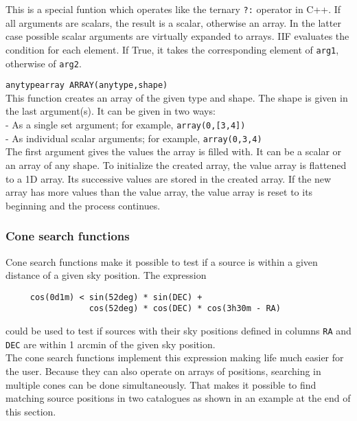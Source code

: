 \begin{description}
    This is a special funtion which operates like the ternary \texttt{?:}
    operator in C++. 
    If all arguments are scalars, the result is a scalar, otherwise
    an array. In the latter case possible scalar arguments are
    virtually expanded to arrays.
    IIF evaluates the condition for each element. If True, it takes
    the corresponding element of \texttt{arg1}, otherwise of \texttt{arg2}.
  \item[] \texttt{anytypearray ARRAY(anytype,shape)}\\
    This function creates an array of the given type and shape.
    The shape is given in the last argument(s).
    It can be given in two ways:
    \\- As a single set argument; for example, \texttt{array(0,[3,4])}
    \\- As individual scalar arguments; for example, \texttt{array(0,3,4)}
    \\The first argument gives the values the array is filled with.
    It can be a scalar or an array of any shape. To initialize the
    created array, the value array is flattened to a 1D array.
    Its successive values are stored in the created array. If the
    new array has more values than the value array, the value array is
    reset to its beginning and the process continues.
\end{description}

\subsubsection{\label{TAQL:CONESEARCH}Cone search functions}
Cone search functions make it possible to test if a source is
within a given distance of a given sky position. The expression
\begin{verbatim}
     cos(0d1m) < sin(52deg) * sin(DEC) +
                 cos(52deg) * cos(DEC) * cos(3h30m - RA)
\end{verbatim}
could be used to test if sources with their sky positions defined
in columns \texttt{RA} and \texttt{DEC} are within 1 arcmin of the
given sky position.
\\The cone search functions implement this expression making life much
easier for the user. Because they
can also operate on arrays of positions, searching in
multiple cones can be done simultaneously. That makes it
possible to find matching source positions in two catalogues as shown
in an example at the end of this section.

